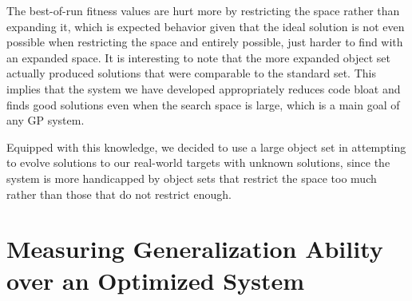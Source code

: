 \documentclass[a4paper,12pt]{report} 	%
\numberwithin{figure}{chapter}
\numberwithin{table}{chapter}
\numberwithin{equation}{chapter}
\begin{document}
\begin{flushleft}
The best-of-run fitness values are hurt more by restricting the space rather than expanding it, which is expected behavior given that the ideal solution is not even possible when restricting the space and entirely possible, just harder to find with an expanded space. It is interesting to note that the more expanded object set actually produced solutions that were comparable to the standard set. This implies that the system we have developed appropriately reduces code bloat and finds good solutions even when the search space is large, which is a main goal of any GP system. 

Equipped with this knowledge, we decided to use a large object set in attempting to evolve solutions to our real-world targets with unknown solutions, since the system is more handicapped by object sets that restrict the space too much rather than those that do not restrict enough.

\section{Measuring Generalization Ability over an Optimized System}

\newpage
\nocite{*}	%
\end{flushleft}
\end{document}
